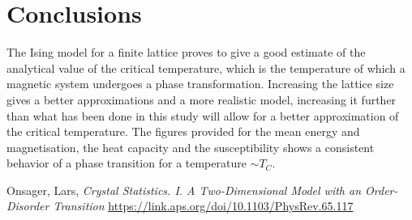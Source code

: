 \documentclass{emulateapj}
\begin{document}
\section{Conclusions}
\label{sec:conclusions}
The Ising model for a finite lattice proves to give a good estimate of the analytical value of the critical temperature, which is the temperature of which a magnetic system undergoes a phase transformation. Increasing the lattice size gives a better approximations and a more realistic model, increasing it further than what has been done in this study will allow for a better approximation of the critical temperature. The figures provided for the mean energy and magnetisation, the heat capacity and the susceptibility shows a consistent behavior of a phase transition for a temperature $\sim T_C$. 

\begin{thebibliography}{}
Onsager, Lars,
 \textit{Crystal Statistics. I. A Two-Dimensional Model with an Order-Disorder Transition}
\url{https://link.aps.org/doi/10.1103/PhysRev.65.117}

\end{thebibliography}
\end{document}
